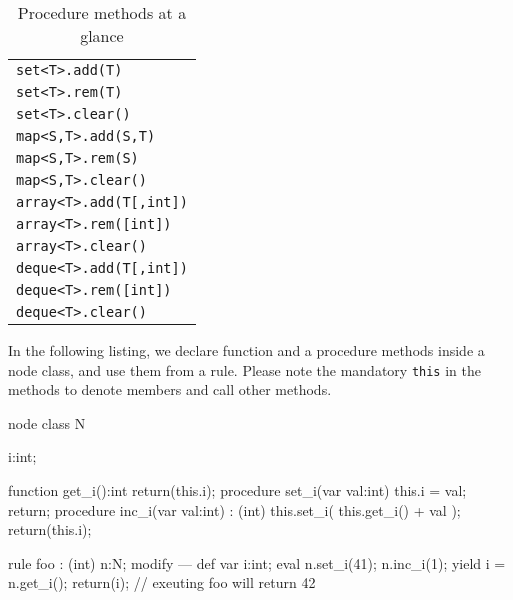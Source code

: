 \begin{table}[htbp]
\centering
\begin{tabular}{|l|}
\hline
\texttt{set<T>.add(T)}\\
\texttt{set<T>.rem(T)}\\
\texttt{set<T>.clear()}\\
\hline
\texttt{map<S,T>.add(S,T)}\\
\texttt{map<S,T>.rem(S)}\\
\texttt{map<S,T>.clear()}\\
\hline
\texttt{array<T>.add(T[,int])}\\
\texttt{array<T>.rem([int])}\\
\texttt{array<T>.clear()}\\
\hline
\texttt{deque<T>.add(T[,int])}\\
\texttt{deque<T>.rem([int])}\\
\texttt{deque<T>.clear()}\\
\hline
\end{tabular}
\caption{Procedure methods at a glance}
\label{procmethstab}
\end{table}


\begin{example}
In the following listing, we declare function and a procedure methods inside a node class, and use them from a rule.
Please note the mandatory \texttt{this} in the methods to denote members and call other methods.
	\begin{grgen}
node class N
{
	i:int;
	
	function get_i():int
	{
		return(this.i);
	}
	procedure set_i(var val:int)
	{
		this.i = val;
		return;
	}
	procedure inc_i(var val:int) : (int)
	{
		this.set_i( this.get_i() + val );
		return(this.i);
	}
}

rule foo : (int)
{
	n:N;
	modify {
	---
		def var i:int;
		eval {
			n.set_i(41);
			n.inc_i(1);
			yield i = n.get_i();
		}
		return(i); // exeuting foo will return 42
	}
}
	\end{grgen}
\end{example}


